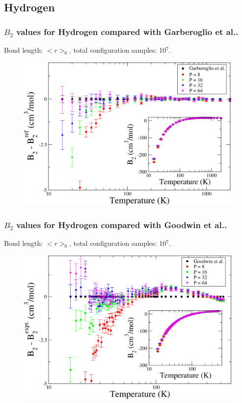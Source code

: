 \documentclass[xcolor=svgnames]{beamer}
\begin{document}
        \subsection{Hydrogen}
            \begin{frame}
                \frametitle{$B_2$ values for Hydrogen compared with Garberoglio et al..}
                \begin{center}Bond length: $< r >_0$, total configuration samples: 10$^7$.\end{center}
                \begin{figure}
                    \centering
                    \includegraphics[scale=0.18,keepaspectratio]{s1GarberoglioAll.png}
                \end{figure}
            \end{frame}
            \begin{frame}
                \frametitle{$B_2$ values for Hydrogen compared with Goodwin et al..}
                \begin{center}Bond length: $< r >_0$, total configuration samples: 10$^7$.\end{center}
                \begin{figure}
                    \centering
                    \includegraphics[scale=0.18,keepaspectratio]{s1GoodwinAll.png}
                \end{figure}
            \end{frame}
\end{document}
